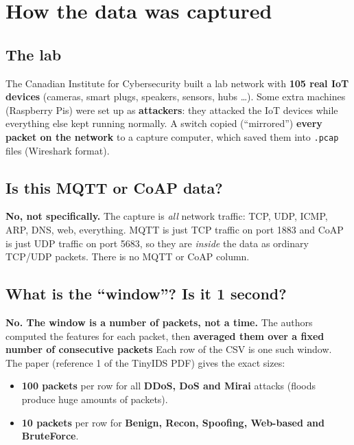 \documentclass[11pt]{article}
\begin{document}
\begin{center}
\end{center}

\newpage
\section*{How the data was captured}

\subsection*{The lab}
The Canadian Institute for Cybersecurity built a lab network with \textbf{105 real IoT devices} (cameras, smart plugs, speakers, sensors, hubs \dots).
Some extra machines (Raspberry Pis) were set up as \textbf{attackers}: they attacked the IoT devices while everything else kept running normally.
A switch copied (``mirrored'') \textbf{every packet on the network} to a capture computer, which saved them into \texttt{.pcap} files (Wireshark format).

\subsection*{Is this MQTT or CoAP data?}
\textbf{No, not specifically.} The capture is \emph{all} network traffic: TCP, UDP, ICMP, ARP, DNS, web, everything.
MQTT is just TCP traffic on port 1883 and CoAP is just UDP traffic on port 5683, so they are \emph{inside} the data as ordinary TCP/UDP packets.
There is no MQTT or CoAP column.

\subsection*{What is the ``window''? Is it 1 second?}
\textbf{No. The window is a number of packets, not a time.}
The authors computed the features for each packet, then \textbf{averaged them over a fixed number of consecutive packets}
Each row of the CSV is one such window. The paper (reference 1 of the TinyIDS PDF) gives the exact sizes:
\begin{itemize}
\item \textbf{100 packets} per row for all \textbf{DDoS, DoS and Mirai} attacks (floods produce huge amounts of packets).
\item \textbf{10 packets} per row for \textbf{Benign, Recon, Spoofing, Web-based and BruteForce}.
\end{itemize}
\end{document}
